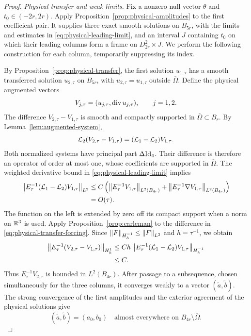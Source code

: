 \begin{proof}
\emph{Physical transfer and weak limits.}
Fix a nonzero null vector $\theta$ and $t_0\in(-2r,2r)$. Apply
Proposition~\ref{prop:physical-amplitudes} to the first coefficient
pair. It supplies three exact smooth solutions on $B_{5r}$, with the
limits and estimates in \eqref{eq:physical-leading-limit}, and an
interval $J$ containing $t_0$ on which their leading columns form a
frame on $D_{2r}^2\times J$. We perform the following construction
for each column, temporarily suppressing its index.

By Proposition~\ref{prop:physical-transfer}, the first solution
$u_{1,\tau}$ has a smooth transferred solution $u_{2,\tau}$ on
$B_{5r}$, with
$u_{2,\tau}=u_{1,\tau}$ outside $\overline\Omega$. Define the
physical augmented vectors
\[
 V_{j,\tau}=(u_{j,\tau},\operatorname{div} u_{j,\tau}),\qquad j=1,2.
\]
The difference $V_{2,\tau}-V_{1,\tau}$ is smooth and compactly
supported in $\overline\Omega\subset B_r$. By
Lemma~\ref{lem:augmented-system},
\begin{equation}\label{eq:physical-transfer-forcing}
 \mathcal L_2(V_{2,\tau}-V_{1,\tau})
       =(\mathcal L_1-\mathcal L_2)V_{1,\tau}.
\end{equation}
Both normalized systems have principal part $\Delta\mathrm{Id}_4$.
Their difference is therefore an operator of order at most one,
whose coefficients are supported in $\overline\Omega$.
The weighted derivative bound in
\eqref{eq:physical-leading-limit} implies
\[
 \begin{aligned}
 \left\lVert E_\tau^{-1}(\mathcal L_1-\mathcal L_2)V_{1,\tau}\right\rVert_{L^2}
 &\leq C\left(
     \left\lVert E_\tau^{-1}V_{1,\tau}\right\rVert_{L^2(B_{4r})}
    +\left\lVert E_\tau^{-1}\nabla V_{1,\tau}\right\rVert_{L^2(B_{4r})}
          \right)\\
 &=O(\tau).
 \end{aligned}
\]
The function on the left is extended by zero off its compact support
when a norm on $\mathbb R^3$ is used. Apply
Proposition~\ref{prop:carleman} to the difference in
\eqref{eq:physical-transfer-forcing}. Since
$\left\lVert F\right\rVert_{H_h^{-1}}\leq\left\lVert F\right\rVert_{L^2}$ and $h=\tau^{-1}$, we obtain
\begin{equation}\label{eq:bounded-transferred-amplitudes}
 \begin{aligned}
 \left\lVert E_\tau^{-1}(V_{2,\tau}-V_{1,\tau})\right\rVert_{H_h^1}
 &\leq Ch\left\lVert E_\tau^{-1}(\mathcal L_1-\mathcal L_2)V_{1,\tau}\right\rVert_{H_h^{-1}}\\
 &\leq C.
 \end{aligned}
\end{equation}
Thus $E_\tau^{-1}V_{2,\tau}$ is bounded in $L^2(B_{4r})$.
After passage to a subsequence, chosen simultaneously for the three
columns, it converges weakly to a vector $(\widetilde a,\widetilde b)$.
The strong convergence of the first amplitudes and the exterior
agreement of the physical solutions give
\begin{equation}\label{eq:exterior-leading-agreement}
 (\widetilde a,\widetilde b)=(a_0,b_0)
 \quad\text{almost everywhere on }
 B_{4r}\setminus\overline\Omega.
\end{equation}


\end{proof}
